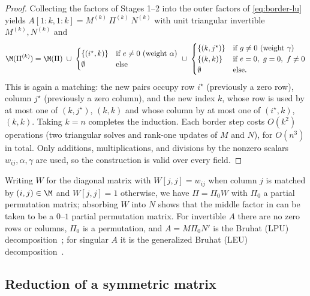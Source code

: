 \begin{proof}
  Collecting the factors of Stages 1--2 into the outer factors of
  \cref{eq:border-lu} yields
  $A[1:k,1:k] = M^{(k)} \, \Pi^{(k)} \, N^{(k)}$ with unit triangular
  invertible $M^{(k)}, N^{(k)}$ and
  \[
    \M(\Pi^{(k)}) = \M(\Pi) \;\cup\;
    \begin{cases}
      \{(i^\star, k)\} & \text{if } e \neq 0 \text{ (weight } \alpha)\\
      \emptyset & \text{else}
    \end{cases}
    \;\cup\;
    \begin{cases}
      \{(k, j^\star)\} & \text{if } g \neq 0 \text{ (weight } \gamma)\\
      \{(k,k)\} & \text{if } e = 0,\ g = 0,\ f \neq 0\\
      \emptyset & \text{else.}
    \end{cases}
  \]
  This is again a matching: the new pairs occupy row $i^\star$ (previously a
  zero row), column $j^\star$ (previously a zero column), and the new index
  $k$, whose row is used by at most one of $(k, j^\star)$, $(k,k)$ and whose
  column by at most one of $(i^\star, k)$, $(k,k)$.  Taking $k = n$
  completes the induction.  Each border step costs $O(k^2)$ operations (two
  triangular solves and rank-one updates of $M$ and $N$), for $O(n^3)$ in
  total.  Only additions, multiplications, and divisions by the nonzero
  scalars $w_{ij}, \alpha, \gamma$ are used, so the construction is valid
  over every field.
\end{proof}

\begin{remark}\label{rem:normalize-weights}
  Writing $W$ for the diagonal matrix with $W[j,j] = w_{ij}$ when column $j$
  is matched by $(i,j) \in \M$ and $W[j,j] = 1$ otherwise, we have
  $\Pi = \Pi_0 W$ with $\Pi_0$ a partial permutation matrix; absorbing $W$
  into $N$ shows that the middle factor in  can be
  taken to be a $0$--$1$ partial permutation matrix.  For invertible $A$
  there are no zero rows or columns, $\Pi_0$ is a permutation, and
  $A = M \Pi_0 N'$ is the Bruhat (LPU)
  decomposition~\cite{elsner_bruhat_1979,strang_lpu_2012}; for singular $A$
  it is the generalized Bruhat (LEU)
  decomposition~\cite{malaschonok_2010,dumas_pernet_sultan_2017}.
\end{remark}

\subsection{Reduction of a symmetric matrix}

